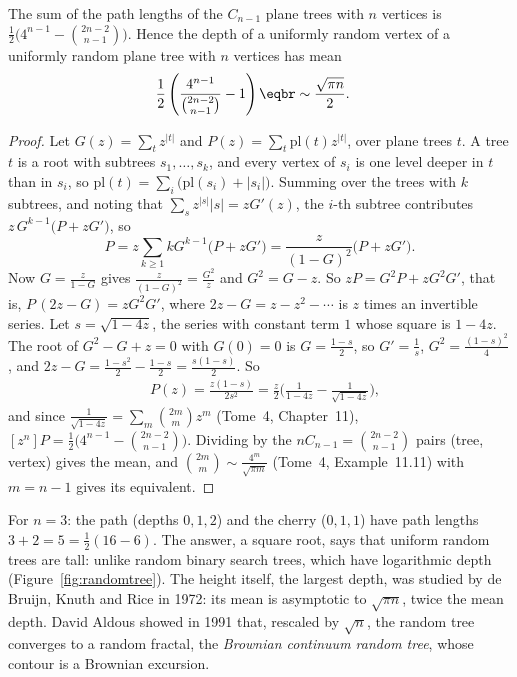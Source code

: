 \begin{theorem}\label{thm:pathlength}
The sum of the path lengths of the $C_{n-1}$ plane trees with $n$ vertices is $\frac12\big(4^{n-1}-\binom{2n-2}{n-1}\big)$. Hence the depth of a uniformly random
vertex of a uniformly random plane tree with $n$ vertices has mean
\[
\begin{aligned}{}&\frac12\left(\frac{4^{n-1}}{\binom{2n-2}{n-1}}-1\right)\eqbr\sim\frac{\sqrt{\pi n}}2 .\end{aligned}
\]
\end{theorem}
\begin{proof}
Let $G(z)=\sum_tz^{|t|}$ and $P(z)=\sum_t\mathrm{pl}(t)z^{|t|}$, over plane trees $t$. A tree $t$ is a root with subtrees $s_1,\dots,s_k$, and every vertex of $s_i$ is one level
deeper in $t$ than in $s_i$, so $\mathrm{pl}(t)=\sum_i\big(\mathrm{pl}(s_i)+|s_i|\big)$. Summing over the trees with $k$ subtrees, and noting that $\sum_sz^{|s|}|s|=zG'(z)$, the
$i$-th subtree contributes $z\,G^{k-1}\big(P+zG'\big)$, so
\[
P=z\sum_{k\ge1}kG^{k-1}\big(P+zG'\big)=\frac z{(1-G)^2}\big(P+zG'\big).
\]
Now $G=\frac z{1-G}$ gives $\frac z{(1-G)^2}=\frac{G^2}z$ and $G^2=G-z$. So $zP=G^2P+zG^2G'$, that is, $P\,(2z-G)=zG^2G'$, where $2z-G=z-z^2-\cdots$ is $z$ times an
invertible series. Let $s=\sqrt{1-4z}$, the series with constant term $1$ whose square is $1-4z$. The root of $G^2-G+z=0$ with $G(0)=0$ is $G=\frac{1-s}2$, so
$G'=\frac1s$, $G^2=\frac{(1-s)^2}4$, and $2z-G=\frac{1-s^2}2-\frac{1-s}2=\frac{s(1-s)}2$. So
\[
\begin{aligned}{}&P(z)=\frac{z(1-s)}{2s^2}=\frac z2\Big(\frac1{1-4z}-\frac1{\sqrt{1-4z}}\Big),\end{aligned}
\]
and since $\frac1{\sqrt{1-4z}}=\sum_m\binom{2m}mz^m$ (Tome~4, Chapter~11), $[z^n]P=\frac12\big(4^{n-1}-\binom{2n-2}{n-1}\big)$. Dividing by the $nC_{n-1}=\binom{2n-2}{n-1}$ pairs (tree, vertex)
gives the mean, and $\binom{2m}m\sim\frac{4^m}{\sqrt{\pi m}}$ (Tome~4, Example~11.11) with $m=n-1$ gives its equivalent.
\end{proof}

For $n=3$: the path (depths $0,1,2$) and the cherry ($0,1,1$) have path lengths $3+2=5=\frac12(16-6)$. The answer, a square root, says that uniform
random trees are tall: unlike random binary search trees, which have logarithmic depth (Figure~\ref{fig:randomtree}). The height itself,
the largest depth, was studied by de Bruijn, Knuth and Rice in 1972: its mean is asymptotic to $\sqrt{\pi n}$, twice the mean depth.
David Aldous showed in 1991 that, rescaled by $\sqrt n$, the random tree converges to a random fractal, the \emph{Brownian continuum random tree},
whose contour is a Brownian excursion.

